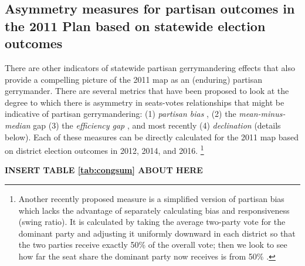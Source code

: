         \subsection*{Asymmetry measures for partisan outcomes in the 2011 Plan based on statewide election outcomes}
%
    There are other indicators of statewide partisan gerrymandering effects that also provide a compelling picture of the 2011 map as an (enduring) partisan gerrymander. There are several metrics that have been proposed to look at the degree to which there is asymmetry in seats-votes relationships that might be indicative of partisan gerrymandering: (1) \textit{partisan bias} \citep{Tufte1973}, (2) the \textit{mean-minus-median} gap \citep{Mcdonald_Best_2015_ELJ} (3) the \textit{efficiency gap} \citep{Stephanopoulos2014_UofChicagoLaw}, and most recently (4) \textit{declination} \citep{Warrington2018} (details below). Each of these measures can be directly calculated for the 2011 map based on district election outcomes in 2012, 2014, and 2016. 
        \footnote{Another recently proposed measure is a simplified version of partisan bias which lacks the advantage of separately calculating bias and responsiveness (swing ratio). It is calculated by taking the average two-party vote for the dominant party and adjusting it uniformly downward in each district so that the two parties receive exactly 50\% of the overall vote; then we look to see how far the seat share the dominant party now receives is from 50\% \citep{Wang2016_SLR}.}
\par
    
        \begin{center}\textbf{INSERT TABLE \ref{tab:congsum} ABOUT HERE} \end{center}
\par
